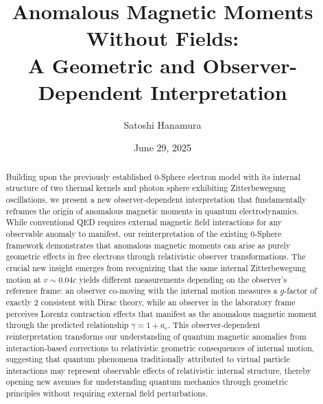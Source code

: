 \documentclass[%
 reprint,
 amsmath,amssymb,
 aps,
]{revtex4-1}
\numberwithin{equation}{section}%
\begin{document}


\title{Anomalous Magnetic Moments Without Fields:\\ A Geometric and Observer-Dependent Interpretation}
\author{Satoshi Hanamura}
\date{June 29, 2025}


\begin{abstract}
Building upon the previously established 0-Sphere electron model with its internal structure of two thermal kernels and photon sphere exhibiting Zitterbewegung oscillations, we present a new observer-dependent interpretation that fundamentally reframes the origin of anomalous magnetic moments in quantum electrodynamics. While conventional QED requires external magnetic field interactions for any observable anomaly to manifest, our reinterpretation of the existing 0-Sphere framework demonstrates that anomalous magnetic moments can arise as purely geometric effects in free electrons through relativistic observer transformations. The crucial new insight emerges from recognizing that the same internal Zitterbewegung motion at $v \sim 0.04c$ yields different measurements depending on the observer's reference frame: an observer co-moving with the internal motion measures a $g$-factor of exactly 2 consistent with Dirac theory, while an observer in the laboratory frame perceives Lorentz contraction effects that manifest as the anomalous magnetic moment through the predicted relationship $\gamma = 1 + a_e$. This observer-dependent reinterpretation transforms our understanding of quantum magnetic anomalies from interaction-based corrections to relativistic geometric consequences of internal motion, suggesting that quantum phenomena traditionally attributed to virtual particle interactions may represent observable effects of relativistic internal structure, thereby opening new avenues for understanding quantum mechanics through geometric principles without requiring external field perturbations.
\end{abstract}


\maketitle
\end{document}
